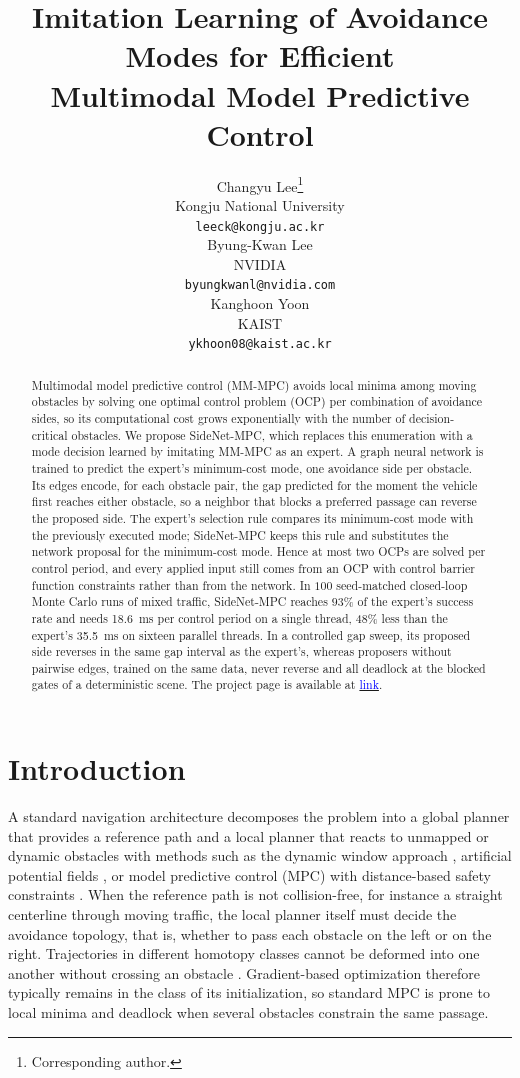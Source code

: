 \documentclass{article}
\title{Imitation Learning of Avoidance Modes for Efficient \\ Multimodal Model Predictive Control}
\author{%
  Changyu Lee\thanks{Corresponding author.} \\
  Kongju National University \\
  \texttt{leeck@kongju.ac.kr} \\
  \And
  Byung-Kwan Lee \\
  NVIDIA \\
  \texttt{byungkwanl@nvidia.com} \\
  \And
  Kanghoon Yoon \\
  KAIST \\
  \texttt{ykhoon08@kaist.ac.kr} \\
}
\theoremstyle{definition}
\begin{document}
\maketitle

\begin{abstract}
Multimodal model predictive control (MM-MPC) avoids local minima among moving obstacles by solving one optimal control problem (OCP) per combination of avoidance sides, so its computational cost grows exponentially with the number of decision-critical obstacles. We propose SideNet-MPC, which replaces this enumeration with a mode decision learned by imitating MM-MPC as an expert. A graph neural network is trained to predict the expert's minimum-cost mode, one avoidance side per obstacle. Its edges encode, for each obstacle pair, the gap predicted for the moment the vehicle first reaches either obstacle, so a neighbor that blocks a preferred passage can reverse the proposed side. The expert's selection rule compares its minimum-cost mode with the previously executed mode; SideNet-MPC keeps this rule and substitutes the network proposal for the minimum-cost mode. Hence at most two OCPs are solved per control period, and every applied input still comes from an OCP with control barrier function constraints rather than from the network. In $100$ seed-matched closed-loop Monte Carlo runs of mixed traffic, SideNet-MPC reaches $93\%$ of the expert's success rate and needs \SI{18.6}{ms} per control period on a single thread, 48\% less than the expert's \SI{35.5}{ms} on sixteen parallel threads. In a controlled gap sweep, its proposed side reverses in the same gap interval as the expert's, whereas proposers without pairwise edges, trained on the same data, never reverse and all deadlock at the blocked gates of a deterministic scene.
The project page is available at \href{https://sail-knu.github.io/Imitation-Learning-of-Avoidance-Modes-for-Computationally-Efficient-MM-MPC/}{\textcolor{blue}{link}}.
\end{abstract}

\section{Introduction}
\label{sec:intro}

 A standard navigation architecture decomposes the problem into a global planner that provides a reference path and a local planner that reacts to unmapped or dynamic obstacles with methods such as the dynamic window approach \citep{fox2002dynamic}, artificial potential fields \citep{khatib1986real,zhang2023obstacle}, or model predictive control (MPC) with distance-based safety constraints \citep{wang2018design,brito2019model,mpc9_lee2023nonlinear}. When the reference path is not collision-free, for instance a straight centerline through moving traffic, the local planner itself must decide the avoidance topology, that is, whether to pass each obstacle on the left or on the right. Trajectories in different homotopy classes cannot be deformed into one another without crossing an obstacle \citep{bhattacharya2010search}. Gradient-based optimization therefore typically remains in the class of its initialization, so standard MPC is prone to local minima and deadlock when several obstacles constrain the same passage.
\end{document}
